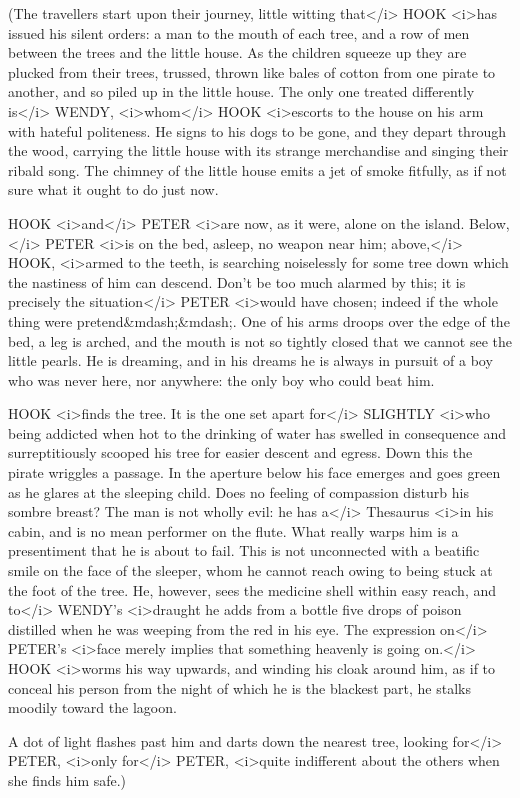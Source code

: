 \begin{stagedir}
(The travellers start upon their journey, little witting that</i> HOOK <i>has issued his silent orders: a man to the mouth of each tree, and a row of men between the trees and the little house. As the children squeeze up they are plucked from their trees, trussed, thrown like bales of cotton from one pirate to another, and so piled up in the little house. The only one treated differently is</i> WENDY, <i>whom</i> HOOK <i>escorts to the house on his arm with hateful politeness. He signs to his dogs to be gone, and they depart through the wood, carrying the little house with its strange merchandise and singing their ribald song. The chimney of the little house emits a jet of smoke fitfully, as if not sure what it ought to do just now.

HOOK <i>and</i> PETER <i>are now, as it were, alone on the island. Below,</i> PETER <i>is on the bed, asleep, no weapon near him; above,</i> HOOK, <i>armed to the teeth, is searching noiselessly for some tree down which the nastiness of him can descend. Don't be too much alarmed by this; it is precisely the situation</i> PETER <i>would have chosen; indeed if the whole thing were pretend&mdash;&mdash;. One of his arms droops over the edge of the bed, a leg is arched, and the mouth is not so tightly closed that we cannot see the little pearls. He is dreaming, and in his dreams he is always in pursuit of a boy who was never here, nor anywhere: the only boy who could beat him.

HOOK <i>finds the tree. It is the one set apart for</i> SLIGHTLY <i>who being addicted when hot to the drinking of water has swelled in consequence and surreptitiously scooped his tree for easier descent and egress. Down this the pirate wriggles a passage. In the aperture below his face emerges and goes green as he glares at the sleeping child. Does no feeling of compassion disturb his sombre breast? The man is not wholly evil: he has a</i> Thesaurus <i>in his cabin, and is no mean performer on the flute. What really warps him is a presentiment that he is about to fail. This is not unconnected with a beatific smile on the face of the sleeper, whom he cannot reach owing to being stuck at the foot of the tree. He, however, sees the medicine shell within easy reach, and to</i> WENDY's <i>draught he adds from a bottle five drops of poison distilled when he was weeping from the red in his eye. The expression on</i> PETER's <i>face merely implies that something heavenly is going on.</i> HOOK <i>worms his way upwards, and winding his cloak around him, as if to conceal his person from the night of which he is the blackest part, he stalks moodily toward the lagoon.

A dot of light flashes past him and darts down the nearest tree, looking for</i> PETER, <i>only for</i> PETER, <i>quite indifferent about the others when she finds him safe.)
\end{stagedir}

